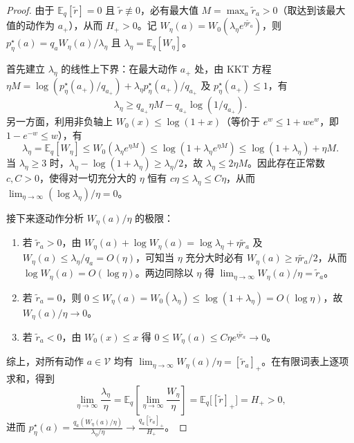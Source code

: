 \documentclass[lang=cn,scheme=chinese,openany]{elegantbook}
\newcommand{\E}{\mathbb E}
\begin{document}
\begin{proof}
由于 $\E_q[\widetilde r]=0$ 且 $\widetilde r\not\equiv 0$，必有最大值 $M=\max_a\widetilde r_a>0$（取达到该最大值的动作为 $a_+$），从而 $H_+>0$。记 $W_\eta(a)=W_0(\lambda_\eta e^{\eta\widetilde r_a})$，则 $p_\eta^\star(a)=q_a W_\eta(a)/\lambda_\eta$ 且 $\lambda_\eta=\E_q[W_\eta]$。

首先建立 $\lambda_\eta$ 的线性上下界：在最大动作 $a_+$ 处，由 KKT 方程 $\eta M=\log(p_\eta^\star(a_+)/q_{a_+})+\lambda_\eta p_\eta^\star(a_+)/q_{a_+}$ 及 $p_\eta^\star(a_+)\le 1$，有
\begin{equation*}
\lambda_\eta\ge q_{a_+}\eta M-q_{a_+}\log(1/q_{a_+}).
\end{equation*}
另一方面，利用非负轴上 $W_0(x)\le\log(1+x)$（等价于 $e^w\le 1+we^w$，即 $1-e^{-w}\le w$），有
\begin{equation*}
\lambda_\eta=\E_q[W_\eta]\le W_0(\lambda_\eta e^{\eta M})\le\log(1+\lambda_\eta e^{\eta M})\le\log(1+\lambda_\eta)+\eta M.
\end{equation*}
当 $\lambda_\eta\ge 3$ 时，$\lambda_\eta-\log(1+\lambda_\eta)\ge\lambda_\eta/2$，故 $\lambda_\eta\le 2\eta M$。因此存在正常数 $c,C>0$，使得对一切充分大的 $\eta$ 恒有 $c\eta\le\lambda_\eta\le C\eta$，从而 $\lim_{\eta\to\infty}(\log\lambda_\eta)/\eta=0$。

接下来逐动作分析 $W_\eta(a)/\eta$ 的极限：
\begin{enumerate}
\item 若 $\widetilde r_a>0$，由 $W_\eta(a)+\log W_\eta(a)=\log\lambda_\eta+\eta\widetilde r_a$ 及 $W_\eta(a)\le\lambda_\eta/q_a=O(\eta)$，可知当 $\eta$ 充分大时必有 $W_\eta(a)\ge\eta\widetilde r_a/2$，从而 $\log W_\eta(a)=O(\log\eta)$。两边同除以 $\eta$ 得 $\lim_{\eta\to\infty}W_\eta(a)/\eta=\widetilde r_a$。
\item 若 $\widetilde r_a=0$，则 $0\le W_\eta(a)=W_0(\lambda_\eta)\le\log(1+\lambda_\eta)=O(\log\eta)$，故 $W_\eta(a)/\eta\to 0$。
\item 若 $\widetilde r_a<0$，由 $W_0(x)\le x$ 得 $0\le W_\eta(a)\le C\eta e^{\eta\widetilde r_a}\to 0$。
\end{enumerate}
综上，对所有动作 $a\in\mathcal V$ 均有 $\lim_{\eta\to\infty}W_\eta(a)/\eta=[\widetilde r_a]_+$。在有限词表上逐项求和，得到
\begin{equation*}
\lim_{\eta\to\infty}\frac{\lambda_\eta}{\eta}=\E_q\left[\lim_{\eta\to\infty}\frac{W_\eta}{\eta}\right]=\E_q\bigl[[\widetilde r]_+\bigr]=H_+>0,
\end{equation*}
进而 $p_\eta^\star(a)=\frac{q_a(W_\eta(a)/\eta)}{\lambda_\eta/\eta}\to \frac{q_a[\widetilde r_a]_+}{H_+}$。
\end{proof}
\end{document}
